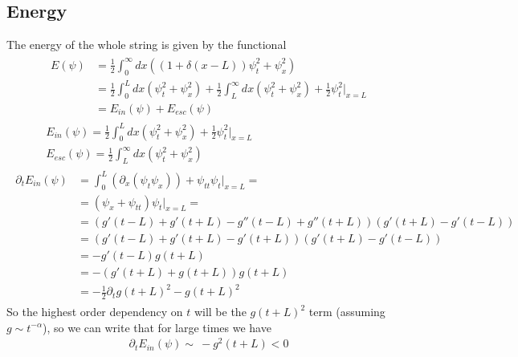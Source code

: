 \documentclass[
a4paper,%
10pt,%
titlepage,%
twoside%
]{article}
\begin{document}
\subsection{Energy}
The energy of the whole string is given by the functional
\begin{gather}
  \begin{split}
    E(\psi)&=\frac{1}{2}\int_0^\infty dx ((1+\delta(x-L))\psi_t^2+\psi_x^2)\\
    &=\frac{1}{2}\int_0^L dx(\psi_t^2+\psi_x^2)+\frac{1}{2}\int_L^\infty dx(\psi_t^2+\psi_x^2)+\frac{1}{2}\psi_t^2\bigg|_{x=L}\\
    &=E_{in}(\psi)+E_{esc}(\psi)
  \end{split}\\
  E_{in}(\psi)=\frac{1}{2}\int_0^L dx(\psi_t^2+\psi_x^2)+\frac{1}{2}\psi_t^2\bigg|_{x=L}\\
  E_{esc}(\psi)=\frac{1}{2}\int_L^\infty dx(\psi_t^2+\psi_x^2)
\end{gather}
\begin{gather}
  \begin{split}\label{eq:enleak}
    \partial_t E_{in}(\psi)&=\int_0^L(\partial_x(\psi_t\psi_x))+\psi_{tt}\psi_t\bigg|_{x=L}=\\
    &=(\psi_x+\psi_{tt})\psi_t\bigg|_{x=L}=\\
    &=(g'(t-L)+g'(t+L)-g''(t-L)+g''(t+L))(g'(t+L)-g'(t-L))\\
    &=(g'(t-L)+g'(t+L)-g'(t+L))(g'(t+L)-g'(t-L))\\
    &=-g'(t-L)g(t+L)\\
    &=-(g'(t+L)+g(t+L))g(t+L)\\
    &=-\frac{1}{2}\partial_tg(t+L)^2-g(t+L)^2
  \end{split}
\end{gather}
So the highest order dependency on $t$ will be the $g(t+L)^2$ term (assuming $g\sim t^{-\alpha}$), so
we can write that for large times we have
\begin{gather}
  \partial_t E_{in}(\psi)\sim~-g^2(t+L)<0
\end{gather}
\end{document}
